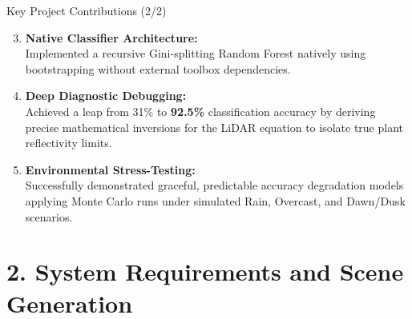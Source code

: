 \documentclass[10pt,aspectratio=169]{beamer}
\begin{document}
\begin{frame}{Key Project Contributions (2/2)}
    \begin{enumerate}
        \setcounter{enumi}{2}
        \item \textbf{Native Classifier Architecture:} \\
        Implemented a recursive Gini-splitting Random Forest natively using bootstrapping without external toolbox dependencies.
        
        \item \textbf{Deep Diagnostic Debugging:} \\
        Achieved a leap from 31\% to \textbf{92.5\%} classification accuracy by deriving precise mathematical inversions for the LiDAR equation to isolate true plant reflectivity limits.
        
        \item \textbf{Environmental Stress-Testing:} \\
        Successfully demonstrated graceful, predictable accuracy degradation models applying Monte Carlo runs under simulated Rain, Overcast, and Dawn/Dusk scenarios.
    \end{enumerate}
\end{frame}


\section{2. System Requirements and Scene Generation}
\end{document}
